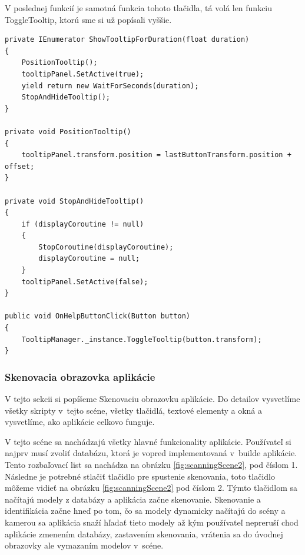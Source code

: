 V poslednej funkcií je samotná funkcia tohoto tlačidla, tá volá len funkciu ToggleTooltip, ktorú sme si už popísali vyššie.

\lstset{style=Csharp}
\begin{lstlisting}[caption={TooltipManager Class - Zobrazovanie vyskakovacieho pomocného poľa. Part 2}, label=tooltipManagerPart2]
private IEnumerator ShowTooltipForDuration(float duration)
{
    PositionTooltip();
    tooltipPanel.SetActive(true); 
    yield return new WaitForSeconds(duration); 
    StopAndHideTooltip(); 
}

private void PositionTooltip()
{
    tooltipPanel.transform.position = lastButtonTransform.position + offset;
}

private void StopAndHideTooltip()
{
    if (displayCoroutine != null)
    {
        StopCoroutine(displayCoroutine);
        displayCoroutine = null;
    }
    tooltipPanel.SetActive(false);
}

public void OnHelpButtonClick(Button button)
{
    TooltipManager._instance.ToggleTooltip(button.transform);
}
\end{lstlisting}

\subsubsection{Skenovacia obrazovka aplikácie}

V tejto sekcii si popíšeme Skenovaciu obrazovku aplikácie. Do detailov vysvetlíme všetky skripty v~tejto scéne, všetky tlačidlá, textové elementy a okná a vysvetlíme, ako aplikácie celkovo funguje. %



V tejto scéne sa nachádzajú všetky hlavné funkcionality aplikácie. Používateľ si najprv musí zvoliť databázu, ktorá je vopred implementovaná v~builde aplikácie. Tento rozbaľovací list sa nachádza na obrázku \ref{fig:scanningScene2}, pod číslom 1. Následne je potrebné stlačiť tlačidlo pre spustenie skenovania, toto tlačidlo môžeme vidieť na obrázku \ref{fig:scanningScene2} pod číslom 2. Týmto tlačidlom sa načítajú modely z databázy a aplikácia začne skenovanie. Skenovanie a identifikácia začne hneď po tom, čo sa modely dynamicky načítajú do scény a kamerou sa aplikácia snaží hľadať tieto modely až kým používateľ nepreruší chod aplikácie zmenením databázy, zastavením skenovania, vrátenia sa do úvodnej obrazovky ale vymazaním modelov v~scéne. 

